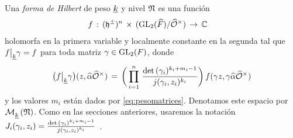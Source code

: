 \begin{defFormaModularDeHilbertDeNivelN}%
	\label{def:formamodulardehilbertdeniveln}
	Una \emph{forma de Hilbert} de peso $\peso{k}$ y nivel $\frak{N}$
	es una funci\'{o}n
	\begin{align*}
		f & \,:\,(\hP^{\pm})^{n}
			\,\times\,(\GL_{2}(\Adfin{F})/\Idfin{\cal{O}})
			\,\rightarrow\,\bb{C}
	\end{align*}
	holomorfa en la primera variable y localmente constante en la
	segunda tal que $f\operadormatrices{\peso{k}}{\gamma}=f$ para toda
	matriz $\gamma\in\GL_{2}(F)$, donde
	\begin{equation}
		\label{eq:matricesoperadordepesokcompleto}
		\big(f\operadormatrices{\peso{k}}{\gamma}\big)
			(z,\hhat{\alpha}\Idfin{\cal{O}})
		\,=\,\bigg(\prod_{i=1}^{n}\,
			\frac{\det(\gamma_{i})^{k_{i}+m_{i}-1}}{%
				j(\gamma_{i},z_{i})^{k_{i}}}
			\bigg)\,f(\gamma z,\gamma\hhat{\alpha}\Idfin{\cal{O}})
	\end{equation}
	y los valores $m_{i}$ est\'{a}n dados por \eqref{eq:pesomatrices}.
	Denotamos este espacio por $\modularH{k}{\frak{N}}$. Como en las
	secciones anteriores, usaremos la notaci\'{o}n
	\begin{math}
		J_{i}(\gamma_{i},z_{i})=
			\frac{\det(\gamma_{i})^{k_{i}+m_{i}-1}}{%
				j(\gamma_{i},z_{i})^{k_{i}}}
	\end{math}~.
\end{defFormaModularDeHilbertDeNivelN}

